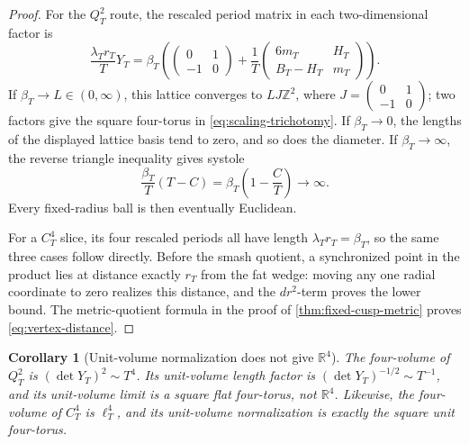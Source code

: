 \documentclass[11pt,letterpaper]{article}
\numberwithin{equation}{section}
\newtheorem{corollary}[theorem]{Corollary}
\theoremstyle{definition}
\theoremstyle{remark}
\newcommand{\R}{\mathbb R}
\newcommand{\Z}{\mathbb Z}
\begin{document}
\begin{proof}
For the \(Q_T^2\) route, the rescaled period matrix in each
two-dimensional factor is
\[
 \frac{\lambda_Tr_T}{T}Y_T
 =\beta_T\left(
 \begin{pmatrix}0&1\\-1&0\end{pmatrix}
 +\frac1T
 \begin{pmatrix}6m_T&H_T\\B_T-H_T&m_T\end{pmatrix}
 \right).
\]
If \(\beta_T\to L\in(0,\infty)\), this lattice converges to
\(LJ\Z^2\), where \(J=\left(\begin{smallmatrix}0&1\\-1&0\end{smallmatrix}\right)\);
two factors give the square four-torus in
\cref{eq:scaling-trichotomy}.  If \(\beta_T\to0\), the lengths of the
displayed lattice basis tend to zero, and so does the diameter.  If
\(\beta_T\to\infty\), the reverse triangle inequality gives systole
\[
 \frac{\beta_T}{T}(T-C)
 =\beta_T\left(1-\frac CT\right)\longrightarrow\infty.
\]
Every fixed-radius ball is then eventually Euclidean.

For a \(C_T^4\) slice, its four rescaled periods all have length
\(\lambda_Tr_T=\beta_T\), so the same three cases follow directly.
Before the smash quotient, a synchronized point in the product lies at
distance exactly \(r_T\) from the fat wedge: moving any one radial
coordinate to zero realizes this distance, and the \(dr^2\)-term proves
the lower bound.  The metric-quotient formula in the proof of
\cref{thm:fixed-cusp-metric} proves \cref{eq:vertex-distance}.
\end{proof}

\begin{corollary}[Unit-volume normalization does not give \(\R^4\)]
\label{cor:unit-volume}
The four-volume of \(Q_T^2\) is \((\det Y_T)^2\sim T^4\).  Its
unit-volume length factor is \((\det Y_T)^{-1/2}\sim T^{-1}\), and its
unit-volume limit is a square flat four-torus, not \(\R^4\).  Likewise,
the four-volume of \(C_T^4\) is \(\ell_T^4\), and its unit-volume
normalization is exactly the square unit four-torus.
\end{corollary}
\end{document}
